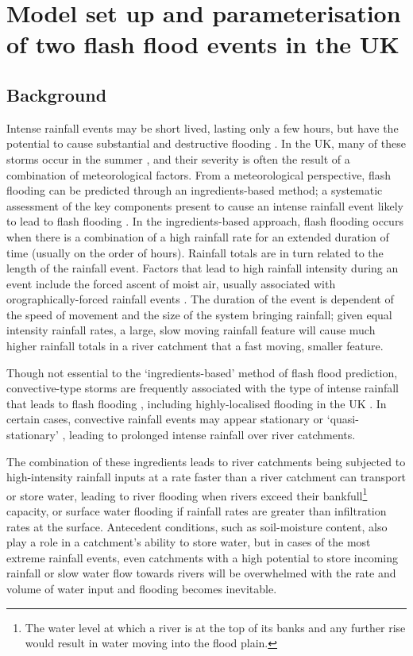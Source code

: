 \chapter{Model set up and parameterisation of two flash flood events in the UK}
\label{chapter_events}

\section{Background}
Intense rainfall events may be short lived, lasting only a few hours, but have the potential to cause substantial and destructive flooding \citep{lane2008climate,pitt2008pitt}. In the UK, many of these storms occur in the summer \citep{Kendon2014}, and their severity is often the result of a combination of meteorological factors. From a meteorological perspective, flash flooding can be predicted through an ingredients-based method; a systematic assessment of the key components present to cause an intense rainfall event likely to lead to flash flooding \citep{Doswell1996}. In the ingredients-based approach, flash flooding occurs when there is a combination of a high rainfall rate for an extended duration of time (usually on the order of hours). Rainfall totals are in turn related to the length of the rainfall event. Factors that lead to high rainfall intensity during an event include the forced ascent of moist air, usually associated with orographically-forced rainfall events \citep{Barros1994,Houze2012}. The duration of the event is dependent of the speed of movement and the size of the system bringing rainfall; given equal intensity rainfall rates, a large, slow moving rainfall feature will cause much higher rainfall totals in a river catchment that a fast moving, smaller feature. 

Though not essential to the `ingredients-based' method of flash flood prediction, convective-type storms are frequently associated with the type of intense rainfall that leads to flash flooding \citep{doswell1993flash}, including highly-localised flooding in the UK \citep{gray1998mesoscale,Browning2007}. In certain cases, convective rainfall events may appear stationary or `quasi-stationary' \citep{chappell1986quasi,warren2014boscastle}, leading to prolonged intense rainfall over river catchments.

The combination of these ingredients leads to river catchments being subjected to high-intensity rainfall inputs at a rate faster than a river catchment can transport or store water, leading to river flooding when rivers exceed their bankfull\footnote{The water level at which a river is at the top of its banks and any further rise would result in water moving into the flood plain.} capacity, or surface water flooding if rainfall rates are greater than infiltration rates at the surface. Antecedent conditions, such as soil-moisture content, also play a role in a catchment's ability to store water, but in cases of the most extreme rainfall events, even catchments with a high potential to store incoming rainfall or slow water flow towards rivers will be overwhelmed with the rate and volume of water input and flooding becomes inevitable.

